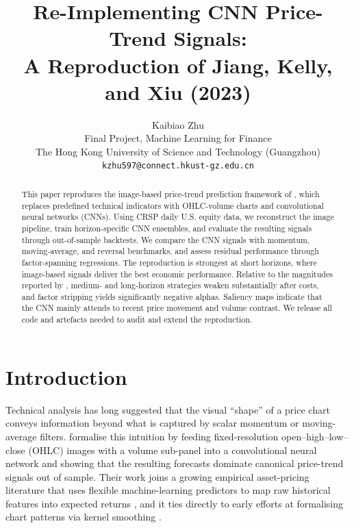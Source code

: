 \documentclass{article}
\title{Re-Implementing CNN Price-Trend Signals:\\
A Reproduction of Jiang, Kelly, and Xiu (2023)}
\author{%
  Kaibiao Zhu \\
  Final Project, Machine Learning for Finance \\
  The Hong Kong University of Science and Technology (Guangzhou) \\
  \texttt{kzhu597@connect.hkust-gz.edu.cn}
}
\begin{document}
\maketitle


\begin{abstract}
This paper reproduces the image-based price-trend prediction framework of
\citet{jiang2023reimagining}, which replaces predefined technical indicators
with OHLC-volume charts and convolutional neural networks (CNNs). Using CRSP
daily U.S. equity data, we reconstruct the image pipeline, train horizon-specific
CNN ensembles, and evaluate the resulting signals through out-of-sample backtests. We compare the CNN signals with momentum,
moving-average, and reversal benchmarks, and assess residual performance through
factor-spanning regressions. The reproduction is strongest at short horizons,
where image-based signals deliver the best economic performance. Relative to
the magnitudes reported by \citet{jiang2023reimagining}, medium- and
long-horizon strategies weaken substantially after costs, and factor stripping
yields significantly negative alphas. Saliency
maps indicate that the CNN mainly attends to recent price movement and volume
contrast. We release all code and artefacts needed to audit and extend the
reproduction.
\end{abstract}


\section{Introduction}
\label{sec:intro}

Technical analysis has long suggested that the visual ``shape'' of a price
chart conveys information beyond what is captured by scalar momentum or
moving-average filters. \citet{jiang2023reimagining} formalise this intuition
by feeding fixed-resolution open--high--low--close (OHLC) images with a
volume sub-panel into a convolutional neural network and showing that the
resulting forecasts dominate canonical price-trend signals out of sample.
Their work joins a growing empirical asset-pricing literature that uses
flexible machine-learning predictors to map raw historical features into
expected returns \citep{gu2020empirical,kelly2019characteristics}, and it
ties directly to early efforts at formalising chart patterns via kernel
smoothing \citep{lo2000foundations}.
\end{document}
